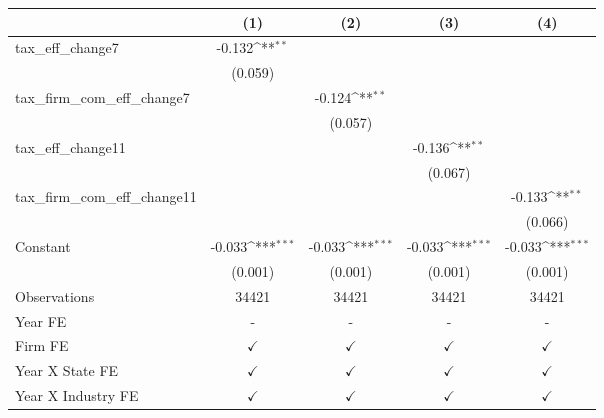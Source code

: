 {
\def\sym#1{\ifmmode^{#1}\else\(^{#1}\)\fi}
\begin{tabular}{l*{4}{c}}
\toprule
                    &\multicolumn{1}{c}{(1)}         &\multicolumn{1}{c}{(2)}         &\multicolumn{1}{c}{(3)}         &\multicolumn{1}{c}{(4)}         \\
\midrule
tax\_eff\_change7     &      -0.132\sym{**} &                     &                     &                     \\
                    &     (0.059)         &                     &                     &                     \\
tax\_firm\_com\_eff\_change7&                     &      -0.124\sym{**} &                     &                     \\
                    &                     &     (0.057)         &                     &                     \\
tax\_eff\_change11    &                     &                     &      -0.136\sym{**} &                     \\
                    &                     &                     &     (0.067)         &                     \\
tax\_firm\_com\_eff\_change11&                     &                     &                     &      -0.133\sym{**} \\
                    &                     &                     &                     &     (0.066)         \\
Constant            &      -0.033\sym{***}&      -0.033\sym{***}&      -0.033\sym{***}&      -0.033\sym{***}\\
                    &     (0.001)         &     (0.001)         &     (0.001)         &     (0.001)         \\
\midrule
Observations        &       34421         &       34421         &       34421         &       34421         \\
Year FE             &           -         &           -         &           -         &           -         \\
Firm FE             &$\checkmark$         &$\checkmark$         &$\checkmark$         &$\checkmark$         \\
Year X State FE     &$\checkmark$         &$\checkmark$         &$\checkmark$         &$\checkmark$         \\
Year X Industry FE  &$\checkmark$         &$\checkmark$         &$\checkmark$         &$\checkmark$         \\
\bottomrule
\end{tabular}
}
